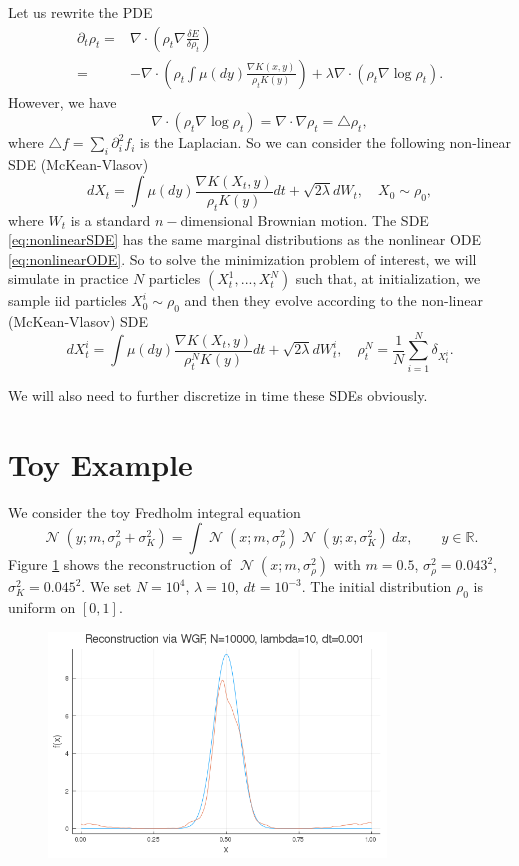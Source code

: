 \documentclass[a4paper]{article}
\DeclareMathOperator{\N}{\mathcal{N}}
\begin{document}
Let us rewrite the PDE 
\begin{align*}
\partial_{t}\rho_{t}= & \nabla\cdot\left(\rho_{t}\nabla\frac{\delta E}{\delta\rho_{t}}\right)\\
= & -\nabla\cdot\left(\rho_{t}\int\mu\left(dy\right)\frac{\nabla K(x,y)}{\rho_{t}K(y)}\right)+\lambda\nabla\cdot\left(\rho_{t}\nabla\log\rho_{t}\right).
\end{align*}
However, we have
\[
\nabla\cdot\left(\rho_{t}\nabla\log\rho_{t}\right)=\nabla\cdot\nabla\rho_{t}=\triangle\rho_{t},
\]
where $\triangle f=\sum_{i}\partial_{i}^{2}f_{i}$ is the Laplacian.
So we can consider the following non-linear SDE (McKean-Vlasov) 
\begin{equation}
dX_{t}=\int\mu\left(dy\right)\frac{\nabla K(X_{t},y)}{\rho_{t}K(y)}dt+\sqrt{2\lambda}dW_{t},\quad X_{0}\sim\rho_{0},\label{eq:nonlinearSDE}
\end{equation}
where $W_{t}$ is a standard $n-$dimensional Brownian motion.
The SDE \eqref{eq:nonlinearSDE} has the same marginal distributions as the nonlinear ODE \eqref{eq:nonlinearODE}.
So to solve the minimization problem of interest, we will simulate in practice $N$ particles $(X_{t}^{1},...,X_{t}^{N})$ such that, at initialization, we sample iid particles $X_{0}^{i}\sim\rho_{0}$ and then they evolve according to the non-linear (McKean-Vlasov) SDE
\[
dX_{t}^{i}=\int\mu\left(dy\right)\frac{\nabla K(X_{t},y)}{\rho_{t}^{N}K(y)}dt+\sqrt{2\lambda}dW_{t}^{i},\quad\rho_{t}^{N}=\frac{1}{N}\sum_{i=1}^{N}\delta_{X_{t}^{i}}.
\]

We will also need to further discretize in time these SDEs obviously.

\section{Toy Example}

We consider the toy Fredholm integral equation
\begin{equation*}
\N(y; m, \sigma_{\rho}^2 + \sigma_K^2) = \int \N(x; m, \sigma_{\rho}^2)\N(y; x, \sigma_K^2)\ dx,\qquad y\in\mathbb{R}.
\end{equation*}
Figure \ref{fig:at} shows the reconstruction of $\N(x; m, \sigma_{\rho}^2)$ with $m=0.5$, $\sigma_{\rho}^2 = 0.043^2$, $\sigma_K^2 = 0.045^2$.
We set $N=10^{4}$, $\lambda = 10$, $dt = 10^{-3}$. The initial distribution $\rho_0$ is uniform on $[0, 1]$.

\begin{figure}
\centering
\includegraphics[width = 0.8\textwidth]{analitically_tractable}
\caption{ }
\label{fig:at}
\end{figure}



\end{document}
